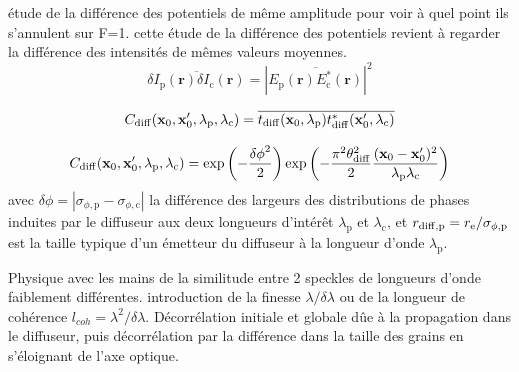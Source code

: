 étude de la différence des potentiels de même amplitude pour voir à quel point ils s'annulent sur F=1. cette étude de la différence des potentiels revient à regarder la différence des intensités de mêmes valeurs moyennes. 
\begin{equation}
\overline{\delta I_{\mathrm{p}}(\mathbf{r}) \delta I_{\mathrm{c}} (\mathbf{r})} = \left| \overline{E_{\mathrm{p}}(\mathbf{r}) E^*_{\mathrm{c}}(\mathbf{r})} \right|^2
\end{equation}


\begin{equation}
C_{\mathrm{diff}}(\mathbf{x}_0,\mathbf{x}_0',\lambda_{\mathrm{p}},\lambda_{\mathrm{c}})=\overline{t_{\mathrm{diff}}(\mathbf{x}_0,\lambda_{\mathrm{p}})t_{\mathrm{diff}}^*(\mathbf{x}_0',\lambda_{\mathrm{c}})}
\end{equation}

\begin{equation}
C_{\mathrm{diff}}(\mathbf{x}_0,\mathbf{x}_0',\lambda_{\mathrm{p}},\lambda_{\mathrm{c}})=\exp{\left( -\frac{{\delta\phi}^2}{2}\right) } \exp{\left( -\frac{\pi^2 \theta_{\mathrm{diff}}^2}{2}\frac{(\mathbf{x}_0- \mathbf{x}_0')^2}{\lambda_{\mathrm{p}} \lambda_{\mathrm{c}}} \right)}
\end{equation}
avec $\delta\phi=\left| \sigma_{\phi,\mathrm{p}} - \sigma_{\phi,\mathrm{c}} \right|$  la différence des largeurs des distributions de phases induites par le diffuseur aux deux longueurs d'intérêt $\lambda_{\mathrm{p}}$ et $\lambda_{\mathrm{c}}$, et $r_{\mathrm{diff,p}}=r_{\mathrm{e}}/\sigma_{\phi,\mathrm{p}}$ est la taille typique d'un émetteur du diffuseur à la longueur d'onde $\lambda_{\mathrm{p}}$. 










Physique avec les mains de la similitude entre 2 speckles de longueurs d'onde faiblement différentes. introduction de la finesse $\lambda / \delta\lambda$ ou de la longueur de cohérence $l_{coh}=\lambda^2/\delta\lambda$.
Décorrélation initiale et globale dûe à la propagation dans le diffuseur, puis décorrélation par la différence dans la taille des grains en s'éloignant de l'axe optique.